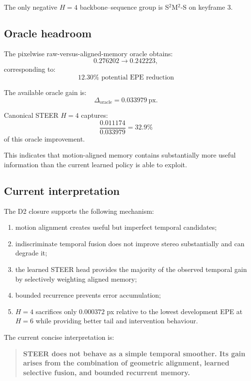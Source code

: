 \documentclass[11pt,a4paper]{article}
\begin{document}
The only negative $H=4$ backbone--sequence group is
S$^2$M$^2$-S on keyframe 3.

\subsection*{Oracle headroom}

The pixelwise raw-versus-aligned-memory oracle obtains:
\[
0.276202
\rightarrow
0.242223,
\]
corresponding to:
\[
\boxed{
12.30\% \text{ potential EPE reduction}
}
\]

The available oracle gain is:
\[
\Delta_{\mathrm{oracle}}
=
0.033979~\mathrm{px}.
\]

Canonical STEER $H=4$ captures:
\[
\frac{0.011174}{0.033979}
=
\boxed{32.9\%}
\]
of this oracle improvement.

This indicates that motion-aligned memory contains substantially more
useful information than the current learned policy is able to exploit.

\subsection*{Current interpretation}

The D2 closure supports the following mechanism:

\begin{enumerate}
    \item motion alignment creates useful but imperfect temporal
    candidates;
    \item indiscriminate temporal fusion does not improve stereo
    substantially and can degrade it;
    \item the learned STEER head provides the majority of the observed
    temporal gain by selectively weighting aligned memory;
    \item bounded recurrence prevents error accumulation;
    \item $H=4$ sacrifices only $0.000372$ px relative to the lowest
    development EPE at $H=6$ while providing better tail and
    intervention behaviour.
\end{enumerate}

The current concise interpretation is:

\begin{quote}
\textbf{STEER does not behave as a simple temporal smoother.
Its gain arises from the combination of geometric alignment,
learned selective fusion, and bounded recurrent memory.}
\end{quote}
\end{document}
